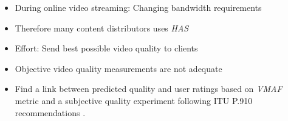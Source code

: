 \begin{itemize}
	\item During online video streaming: Changing bandwidth requirements
	\item Therefore many content distributors uses \textit{HAS} %
	\item Effort: Send best possible video quality to clients 
	\item Objective video quality measurements are not adequate
	\item Find a link between predicted quality and user ratings based on \textit{VMAF} metric \cite{lin2013:mmf,lin2014:fvqa} and a subjective quality experiment following ITU P.910 recommendations \cite{rec1998p}.
\end{itemize}